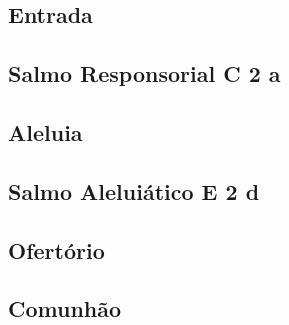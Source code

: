 
\subsection{Entrada}\label{subsection:proprium-sanctorum/in-transfiguratione-domini/psalmi-ad-introitum}

\AllowPageFlush

\subsection[Salmo Responsorial]{Salmo Responsorial \textmd{C 2 a}}\label{subsection:proprium-sanctorum/in-transfiguratione-domini/psalmus-responsorius}

\AllowPageFlush

\subsection{Aleluia}\label{subsection:proprium-sanctorum/in-transfiguratione-domini/alleluia}

\AllowPageFlush

\subsection[Salmo Aleluiático]{Salmo Aleluiático \textmd{E 2 d}}\label{subsection:proprium-sanctorum/in-transfiguratione-domini/psalmus-alleluiaticus}

\AllowPageFlush

\subsection{Ofertório}\label{subsection:proprium-sanctorum/in-transfiguratione-domini/psalmi-ad-offertorium}

\AllowPageFlush

\subsection{Comunhão}\label{subsection:proprium-sanctorum/in-transfiguratione-domini/psalmi-ad-communionem}
